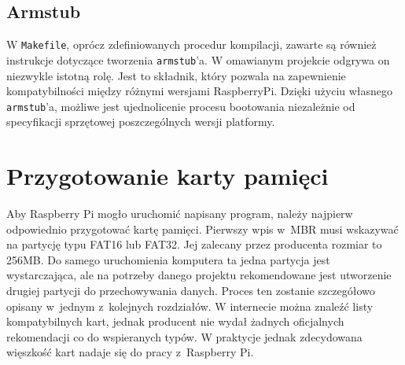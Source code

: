 \documentclass[shortabstract]{iithesis}
\begin{document}
\subsection{Armstub}
W \texttt{Makefile}, oprócz zdefiniowanych procedur kompilacji, zawarte są również instrukcje dotyczące tworzenia \texttt{armstub}'a. W omawianym projekcie odgrywa on niezwykle istotną rolę. Jest to składnik, który pozwala na zapewnienie kompatybilności między różnymi wersjami RaspberryPi. Dzięki użyciu własnego \texttt{armstub}'a, możliwe jest ujednolicenie procesu bootowania niezależnie od specyfikacji sprzętowej poszczególnych wersji platformy.

\section{Przygotowanie karty pamięci}
Aby Raspberry Pi mogło uruchomić napisany program, należy najpierw odpowiednio przygotować kartę pamięci. Pierwszy wpis w~MBR musi wskazywać na partycję typu FAT16 lub FAT32. Jej zalecany przez producenta rozmiar to 256MB. Do samego uruchomienia komputera ta jedna partycja jest wystarczająca, ale na potrzeby danego projektu rekomendowane jest utworzenie drugiej partycji do przechowywania danych. Proces ten zostanie szczegółowo opisany w~jednym z~kolejnych rozdziałów. W internecie można znaleźć listy kompatybilnych kart, jednak producent nie wydał żadnych oficjalnych rekomendacji co do wspieranych typów. W praktycje jednak zdecydowana więszkość kart nadaje się do pracy z~Raspberry Pi.
\end{document}
